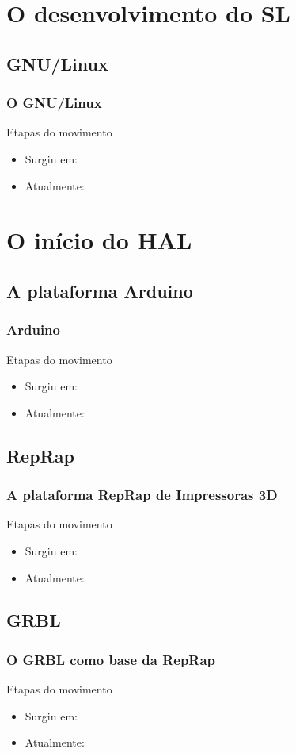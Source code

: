 \documentclass{beamer}
\begin{document}
\section{O desenvolvimento do SL}
\subsection{GNU/Linux}
\frame
{
    \frametitle{O GNU/Linux}
    \begin{beamerboxesrounded}[shadow=true]
    {Etapas do movimento}
        \begin{itemize}
            \item Surgiu em:
            \item Atualmente:
        \end{itemize}
    \end{beamerboxesrounded}
}


\section{O início do HAL}

\subsection{A plataforma Arduino}
\frame
{
    \frametitle{Arduino}
    \begin{beamerboxesrounded}[shadow=true]
    {Etapas do movimento}
        \begin{itemize}
            \item Surgiu em:
            \item Atualmente:
        \end{itemize}
    \end{beamerboxesrounded}
}
\subsection{RepRap}
\frame
{
    \frametitle{A plataforma RepRap de Impressoras 3D}
    \begin{beamerboxesrounded}[shadow=true]
    {Etapas do movimento}
        \begin{itemize}
            \item Surgiu em:
            \item Atualmente:
        \end{itemize}
    \end{beamerboxesrounded}
}

\subsection{GRBL}
\frame
{
    \frametitle{O GRBL como base da RepRap}
    \begin{beamerboxesrounded}[shadow=true]
    {Etapas do movimento}
        \begin{itemize}
            \item Surgiu em:
            \item Atualmente:
        \end{itemize}
    \end{beamerboxesrounded}
}
\end{document}
